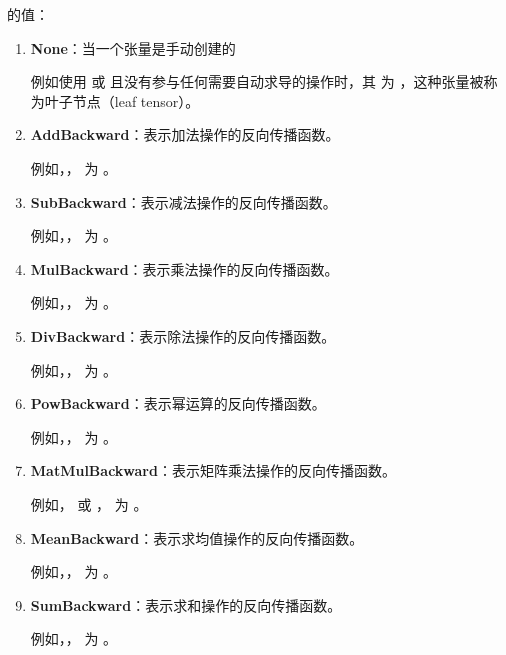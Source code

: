 的值：
\begin{enumerate}[label=\arabic*)]
    \item \textbf{None}：当一个张量是手动创建的
    
    例如使用  或 且没有参与任何需要自动求导的操作时，其  为 ，这种张量被称为叶子节点（leaf tensor）。

    \item \textbf{AddBackward}：表示加法操作的反向传播函数。
    
    例如，， 为 。

    \item \textbf{SubBackward}：表示减法操作的反向传播函数。
    
    例如，， 为 。

    \item \textbf{MulBackward}：表示乘法操作的反向传播函数。
    
    例如，， 为 。

    \item \textbf{DivBackward}：表示除法操作的反向传播函数。
    
    例如，， 为 。

    \item \textbf{PowBackward}：表示幂运算的反向传播函数。
    
    例如，， 为 。

    \item \textbf{MatMulBackward}：表示矩阵乘法操作的反向传播函数。
    
    例如， 或 ， 为 。

    \item \textbf{MeanBackward}：表示求均值操作的反向传播函数。
    
    例如，， 为 。

    \item \textbf{SumBackward}：表示求和操作的反向传播函数。
    
    例如，， 为 。


\end{enumerate}
